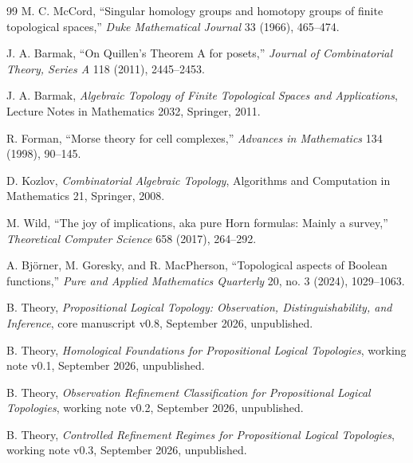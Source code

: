 \documentclass[11pt]{article}
\theoremstyle{definition}
\begin{document}
\begin{thebibliography}{99}
M. C. McCord,
``Singular homology groups and homotopy groups of finite topological spaces,''
\emph{Duke Mathematical Journal} 33 (1966), 465--474.

J. A. Barmak,
``On Quillen's Theorem A for posets,''
\emph{Journal of Combinatorial Theory, Series A} 118 (2011), 2445--2453.

J. A. Barmak,
\emph{Algebraic Topology of Finite Topological Spaces and Applications},
Lecture Notes in Mathematics 2032, Springer, 2011.

R. Forman,
``Morse theory for cell complexes,''
\emph{Advances in Mathematics} 134 (1998), 90--145.

D. Kozlov,
\emph{Combinatorial Algebraic Topology},
Algorithms and Computation in Mathematics 21, Springer, 2008.

M. Wild,
``The joy of implications, aka pure Horn formulas: Mainly a survey,''
\emph{Theoretical Computer Science} 658 (2017), 264--292.

A. Bj\"orner, M. Goresky, and R. MacPherson,
``Topological aspects of Boolean functions,''
\emph{Pure and Applied Mathematics Quarterly} 20, no. 3 (2024), 1029--1063.

B. Theory,
\emph{Propositional Logical Topology: Observation, Distinguishability, and Inference},
core manuscript v0.8, September 2026, unpublished.

B. Theory,
\emph{Homological Foundations for Propositional Logical Topologies}, working note v0.1,
September 2026, unpublished.

B. Theory,
\emph{Observation Refinement Classification for Propositional Logical Topologies}, working note v0.2,
September 2026, unpublished.

B. Theory,
\emph{Controlled Refinement Regimes for Propositional Logical Topologies}, working note v0.3,
September 2026, unpublished.
\end{thebibliography}
\end{document}
